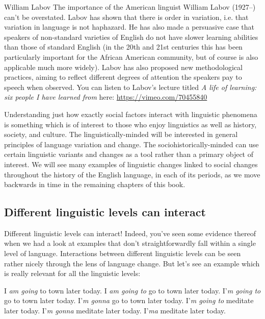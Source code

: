 \begin{peoplebox}{William Labov}
The importance of the American linguist William Labov (1927--) can't be overstated. Labov has shown that there is order in variation, i.e. that variation in language is not haphazard. He has also made a persuasive case that speakers of non-standard varieties of English do not have slower learning abilities than those of standard English (in the 20th and 21st centuries this has been particularly important for the African American community, but of course is also applicable much more widely). Labov has also proposed new methodological practices, aiming to reflect different degrees of attention the speakers pay to speech when observed. You can listen to Labov's lecture titled \emph{A life of learning: six people I have learned from} here: \url{https://vimeo.com/70455840} 
\end{peoplebox}


\noindent Understanding just how exactly social factors interact with linguistic phenomena is something which is of interest to those who enjoy linguistics as well as history, society, and culture. The linguistically-minded will be interested in general principles of language variation and change. The sociohistorically-minded can use certain linguistic variants and changes as a tool rather than a primary object of interest. We will see many examples of linguistic changes linked to social changes throughout the history of the English language, in each of its periods, as we move backwards in time in the remaining chapters of this book.

\subsection{Different linguistic levels can interact}\label{linguistic-interaction}
Different linguistic levels can interact! Indeed, you've seen some evidence thereof when we had a look at examples that don't straightforwardly fall within a single level of language. Interactions between different linguistic levels can be seen rather nicely through the lens of language change. But let's see an example which is really relevant for all the linguistic levels:

\begin{exe}
  \ex \begin{xlist}
    \ex I \emph{am going} to town later today.
    \ex I \emph{am going to} go to town later today.
    \ex I'\emph{m going to} go to town later today.
    \ex I'\emph{m gonna} go to town later today.
    \ex I'\emph{m going to} meditate later today.
    \ex I'\emph{m gonna} meditate later today.
    \ex I'\emph{ma} meditate later today.
  \end{xlist}
\end{exe}

